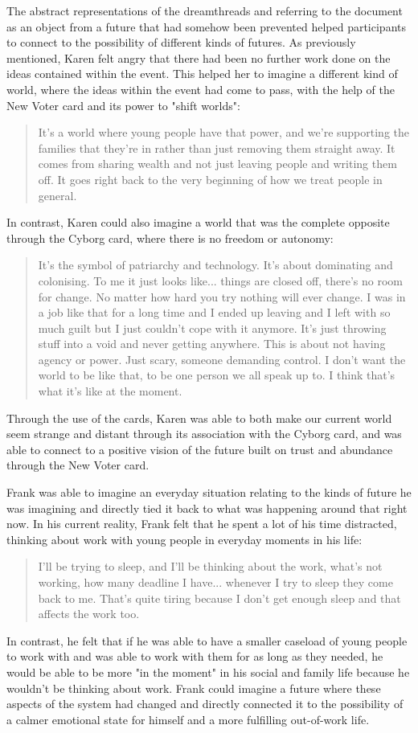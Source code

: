 The abstract representations of the dreamthreads and referring to the document as an object from a future that had somehow been prevented helped participants to connect to the possibility of different kinds of futures. As previously mentioned, Karen felt angry that there had been no further work done on the ideas contained within the event. This helped her to imagine a different kind of world, where the ideas within the event had come to pass, with the help of the New Voter card and its power to "shift worlds":
\begin{quote}
It's a world where young people have that power, and we're supporting the families that they're in rather than just removing them straight away. It comes from sharing wealth and not just leaving people and writing them off. It goes right back to the very beginning of how we treat people in general.
\end{quote}
In contrast, Karen could also imagine a world that was the complete opposite through the Cyborg card, where there is no freedom or autonomy:
\begin{quote}
It's the symbol of patriarchy and technology. It's about dominating and colonising. To me it just looks like... things are closed off, there's no room for change. No matter how hard you try nothing will ever change. I was in a job like that for a long time and I ended up leaving and I left with so much guilt but I just couldn't cope with it anymore. It's just throwing stuff into a void and never getting anywhere. This is about not having agency or power. Just scary, someone demanding control. I don't want the world to be like that, to be one person we all speak up to. I think that's what it's like at the moment.
\end{quote}
Through the use of the cards, Karen was able to both make our current world seem strange and distant through its association with the Cyborg card, and was able to connect to a positive vision of the future built on trust and abundance through the New Voter card.

Frank was able to imagine an everyday situation relating to the kinds of future he was imagining and directly tied it back to what was happening around that right now. In his current reality, Frank felt that he spent a lot of his time distracted, thinking about work with young people in everyday moments in his life:
\begin{quote}
I'll be trying to sleep, and I'll be thinking about the work, what's not working, how many deadline I have... whenever I try to sleep they come back to me. That's quite tiring because I don't get enough sleep and that affects the work too. 
\end{quote}
In contrast, he felt that if he was able to have a smaller caseload of young people to work with and was able to work with them for as long as they needed, he would be able to be more "in the moment" in his social and family life because he wouldn't be thinking about work. Frank could imagine a future where these aspects of the system had changed and directly connected it to the possibility of a calmer emotional state for himself and a more fulfilling out-of-work life. 

